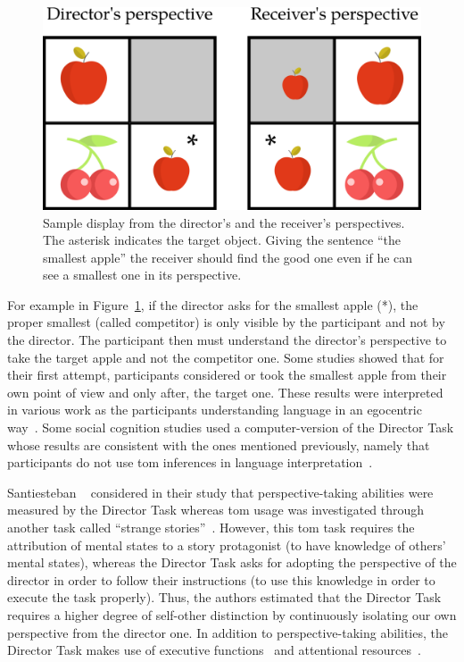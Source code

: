 \documentclass[a4paper,11pt,twoside]{StyleThese}
\begin{document}
\begin{figure}[ht!]
	\centering
	\includegraphics[scale=0.25]{figures/chapter4/dt_apple.png}
	\caption{\label{chap9:fig:dt_apple} Sample display from the director's and the receiver's perspectives. The asterisk indicates the target object. Giving the sentence ``the smallest apple'' the receiver should find the good one even if he can see a smallest one in its perspective. }
\end{figure}

For example in Figure~\ref{chap9:fig:dt_apple}, if the director asks for the smallest apple (*), the proper smallest (called competitor) is only visible by the participant and not by the director. The participant then must understand the director's perspective to take the target apple and not the competitor one. Some studies showed that for their first attempt, participants considered or took the smallest apple from their own point of view and only after, the target one. These results were interpreted in various work as the participants understanding language in an egocentric way~\cite{keysar_1994_illusory, keysar_1998_egocentric, keysar_2002_self, keysar_2003_limits}. 
Some social cognition studies used a computer-version of the Director Task whose results are consistent with the ones mentioned previously, namely that participants do not use \acrshort{tom} inferences in language interpretation~\cite{dumontheil_2010_online}.

Santiesteban \etal{}~\cite{santiesteban_2012_training} considered in their study that perspective-taking abilities were measured by the Director Task whereas \acrshort{tom} usage was investigated through another task called ``strange stories''~\cite{happe_1994_advanced}. However, this \acrshort{tom} task requires the attribution of mental states to a story protagonist (to have knowledge of others' mental states), whereas the Director Task asks for adopting the perspective of the director in order to follow their instructions (to use this knowledge in order to execute the task properly). Thus, the authors estimated that the Director Task requires a higher degree of self-other distinction by continuously isolating our own perspective from the director one. In addition to perspective-taking abilities, the Director Task makes use of executive functions~\cite{rubio_2017_director} and attentional resources~\cite{lin_2010_reflexively}.
\end{document}
